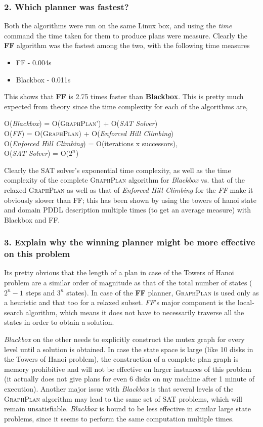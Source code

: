 \documentclass[10pt, letter]{article}
\begin{document}
\subsubsection*{2. Which planner was fastest?}
Both the algorithms were run on the same Linux box, and using the \textit{time} command the time taken for them to produce plans were measure. Clearly the \textbf{FF} algorithm was the fastest among the two, with the following time measures \\
\begin{itemize}
\item FF - 0.004s
\item Blackbox - 0.011s
\end{itemize}
This shows that \textbf{FF} is 2.75 times faster than \textbf{Blackbox}. This is pretty much expected from theory since the time complexity for each of the algorithms are,
\begin{center}
	O(\textit{Blackbox}) = O(\textsc{GraphPlan'}) + O(\textit{SAT Solver})\\
	O(\textit{FF}) = O(\textsc{GraphPlan}) + O(\textit{Enforced Hill Climbing})\\
	O(\textit{Enforced Hill Climbing}) = O(iterations x successors),\\
	O(\textit{SAT Solver}) = O($2^n$)
\end{center}
Clearly the SAT solver's exponential time complexity, as well as the time complexity of the complete \textsc{GraphPlan} algorithm for \textit{Blackbox} vs. that of the relaxed \textsc{GraphPlan} as well as that of \textit{Enforced Hill Climbing} for the \textit{FF} make it obviously slower than FF; this has been shown by using the towers of hanoi state and domain PDDL description multiple times (to get an average measure) with Blackbox and FF.
\subsubsection*{3. Explain why the winning planner might be more effective on this problem}
Its pretty obvious that the length of a plan in case of the Towers of Hanoi problem are a similar order of magnitude as that of the total number of states ($2^n - 1$ steps and $3^n$ states). In case of the \textbf{FF} planner, \textsc{GraphPlan} is used only as a heuristic and that too for a relaxed subset. \textit{FF}'s major component is the local-search algorithm, which means it does not have to necessarily traverse all the states in order to obtain a solution.

\textit{Blackbox} on the other needs to explicitly construct the mutex graph for every level until a solution is obtained. In case the state space is large (like 10 disks in the Towers of Hanoi problem), the construction of a complete plan graph is memory prohibitive and will not be effective on larger instances of this problem (it actually does not give plans for even 6 disks on my machine after 1 minute of execution). Another major issue with \textit{Blackbox} is that several levels of the \textsc{GraphPlan} algorithm may lead to the same set of SAT problems, which will remain unsatisfiable. \textit{Blackbox} is bound to be less effective in similar large state problems, since it seems to perform the same computation multiple times.
\end{document}
